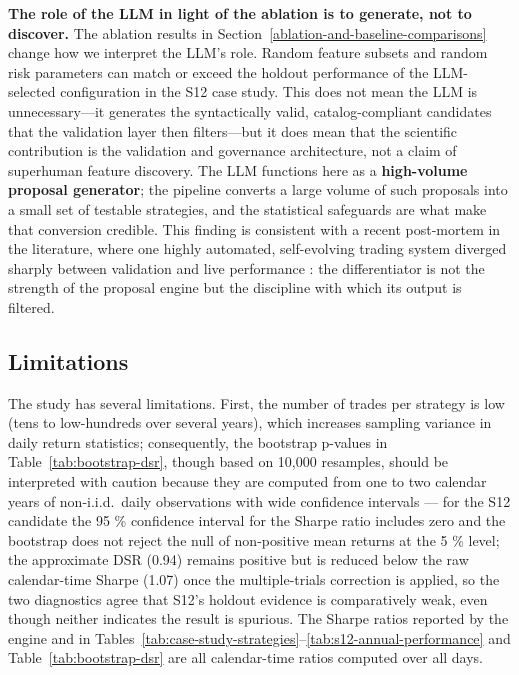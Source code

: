 \documentclass[analytics,article,submit,pdftex,moreauthors]{Definitions/mdpi}
\begin{document}
\textbf{The role of the LLM in light of the ablation is to generate, not to discover.} The ablation results in Section~\ref{ablation-and-baseline-comparisons} change how we interpret the LLM's role. Random feature subsets and random risk parameters can match or exceed the holdout performance of the LLM-selected configuration in the S12 case study. This does not mean the LLM is unnecessary---it generates the syntactically valid, catalog-compliant candidates that the validation layer then filters---but it does mean that the scientific contribution is the validation and governance architecture, not a claim of superhuman feature discovery. The LLM functions here as a \textbf{high-volume proposal generator}; the pipeline converts a large volume of such proposals into a small set of testable strategies, and the statistical safeguards are what make that conversion credible. This finding is consistent with a recent post-mortem in the literature, where one highly automated, self-evolving trading system diverged sharply between validation and live performance \citep{chen_2025_redqueen}: the differentiator is not the strength of the proposal engine but the discipline with which its output is filtered.

\subsection{Limitations}\label{limitations}

The study has several limitations. First, the number of trades per strategy is low (tens to low-hundreds over several years), which increases sampling variance in daily return statistics; consequently, the bootstrap p-values in Table~\ref{tab:bootstrap-dsr}, though based on 10,000 resamples, should be interpreted with caution because they are computed from one to two calendar years of non-i.i.d.~daily observations with wide confidence intervals --- for the S12 candidate the 95 \% confidence interval for the Sharpe ratio includes zero and the bootstrap does not reject the null of non-positive mean returns at the 5 \% level; the approximate DSR (0.94) remains positive but is reduced below the raw calendar-time Sharpe (1.07) once the multiple-trials correction is applied, so the two diagnostics agree that S12's holdout evidence is comparatively weak, even though neither indicates the result is spurious. The Sharpe ratios reported by the engine and in Tables~\ref{tab:case-study-strategies}--\ref{tab:s12-annual-performance} and Table~\ref{tab:bootstrap-dsr} are all calendar-time ratios computed over all days.
\end{document}
